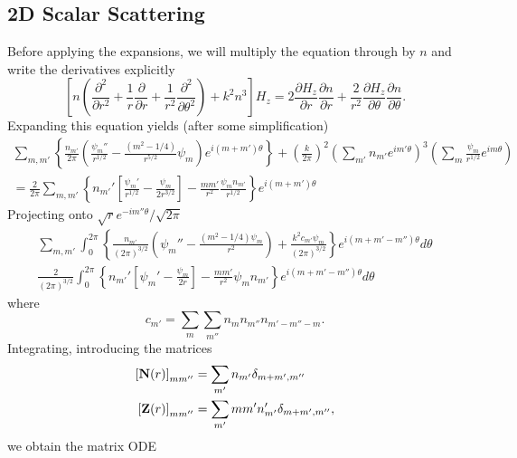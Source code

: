 \subsection{2D Scalar Scattering}
Before applying the expansions, we will multiply the equation through 
by $n$ and write the derivatives explicitly
  \begin{equation}
    \left[n\left(\frac{\partial^2}{\partial r^2}+\frac{1}{r}\frac{\partial}{\partial r}+\frac{1}{r^2}\frac{\partial^2}{\partial\theta^2}\right)+k^2n^3\right]H_z
    =
    2\frac{\partial H_z}{\partial r}\frac{\partial n}{\partial r}+\frac{2}{r^2}\frac{\partial H_z}{\partial\theta}\frac{\partial n}{\partial\theta}.
  \end{equation}
Expanding this equation yields (after some simplification)
  \begin{multline}
   \sum_{m,m'}
    \left\{\frac{n_{m'}}{2\pi}\left(\frac{\psi_{m}''}{r^{1/2}}-\frac{(m^2-1/4)}{r^{5/2}}\psi_m\right)e^{i(m+m')\theta}\right\}
	+\left(\frac{k}{2\pi}\right)^2\left(\sum_{m'}n_{m'}e^{im'\theta}\right)^3\left(\sum_m\frac{\psi_m}{r^{1/2}}e^{im\theta}\right)\\
	=\frac{2}{2\pi}\sum_{m,m'}\left\{n_{m'}'\left[\frac{\psi_m'}{r^{1/2}}-\frac{\psi_m}{2r^{3/2}}\right]-\frac{mm'}{r^2}\frac{\psi_mn_{m'}}{r^{1/2}}\right\}e^{i(m+m')\theta}
  \end{multline}
Projecting onto $\sqrt{r}e^{-im''\theta}/\sqrt{2\pi}$
  \begin{multline}
    \sum_{m,m'}\int_0^{2\pi}\left\{\frac{n_{m'}}{(2\pi)^{3/2}}\left(\psi_m''-\frac{(m^2-1/4)\psi_m}{r^2}\right)+\frac{k^2c_{m'}\psi_m}{(2\pi)^{3/2}}\right\}e^{i(m+m'-m'')\theta}d\theta\\
    \frac{2}{(2\pi)^{3/2}}\int_0^{2\pi}\left\{n_{m'}'\left[\psi_m'-\frac{\psi_m}{2r}\right]-\frac{mm'}{r^2}\psi_mn_{m'}\right\}e^{i(m+m'-m'')\theta}d\theta
  \end{multline}
where
  \begin{equation}
   c_{m'} = \sum_{m}\sum_{m''}n_mn_{m''}n_{m'-m''-m}.
  \end{equation}
Integrating, introducing the matrices
  \begin{subequations}
  \begin{align}
   \left[\mathbf{N}(r)\right]_{mm''}	&= \sum_{m'}n_{m'}\delta_{m+m',m''}	\\
   \left[\mathbf{Z}(r)\right]_{mm''}	&= \sum_{m'}mm'n_{m'}'\delta_{m+m',m''},
  \end{align}
  \end{subequations}
we obtain the matrix ODE
